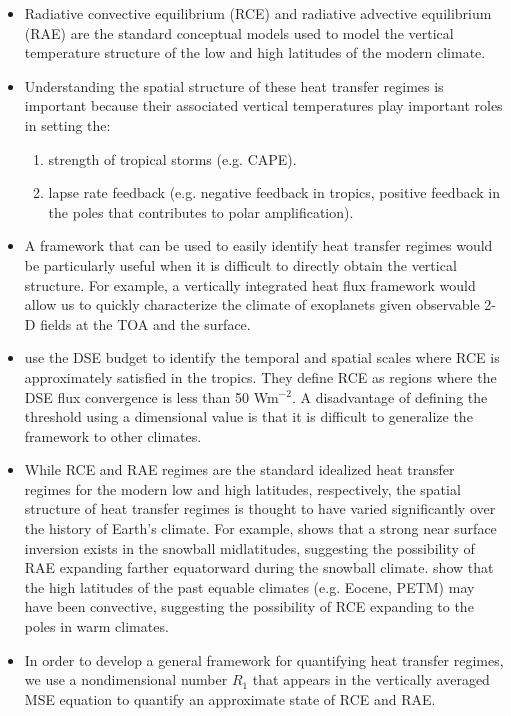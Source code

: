 \documentclass{ametsocV5}
\begin{document}
\begin{itemize}
  \item Radiative convective equilibrium (RCE) and radiative advective equilibrium (RAE) are the standard conceptual models used to model the vertical temperature structure of the low and high latitudes of the modern climate.
  \item Understanding the spatial structure of these heat transfer regimes is important because their associated vertical temperatures play important roles in setting the:
        \begin{enumerate}
          \item strength of tropical storms (e.g. CAPE).
          \item lapse rate feedback (e.g. negative feedback in tropics, positive feedback in the poles that contributes to polar amplification).
        \end{enumerate}
  \item A framework that can be used to easily identify heat transfer regimes would be particularly useful when it is difficult to directly obtain the vertical structure. For example, a vertically integrated heat flux framework would allow us to quickly characterize the climate of exoplanets given observable 2-D fields at the TOA and the surface.
  \item \cite{jakob2019} use the DSE budget to identify the temporal and spatial scales where RCE is approximately satisfied in the tropics. They define RCE as regions where the DSE flux convergence is less than 50 Wm$^{-2}$. A disadvantage of defining the threshold using a dimensional value is that it is difficult to generalize the framework to other climates.
  \item While RCE and RAE regimes are the standard idealized heat transfer regimes for the modern low and high latitudes, respectively, the spatial structure of heat transfer regimes is thought to have varied significantly over the history of Earth's climate. For example, \cite{pierrehumbert2005} shows that a strong near surface inversion exists in the snowball midlatitudes, suggesting the possibility of RAE expanding farther equatorward during the snowball climate. \cite{abbot2008} show that the high latitudes of the past equable climates (e.g. Eocene, PETM) may have been convective, suggesting the possibility of RCE expanding to the poles in warm climates.
  \item In order to develop a general framework for quantifying heat transfer regimes, we use a nondimensional number \(R_{1}\) that appears in the vertically averaged MSE equation to quantify an approximate state of RCE and RAE.

\end{itemize}
\end{document}
